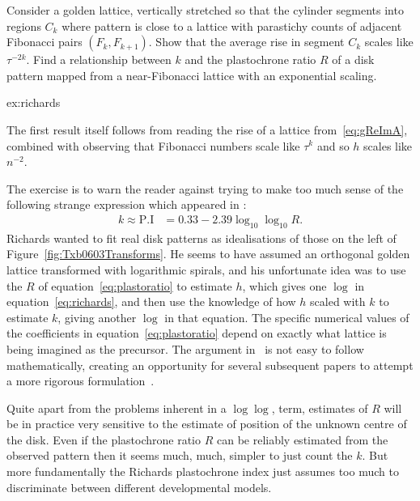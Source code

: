 \begin{jExercise}\label{ex:richards}
 Consider a golden lattice, vertically stretched so that the cylinder segments into regions $C_k$ where pattern is close to a lattice with parastichy counts of adjacent Fibonacci pairs $(F_k,F_{k+1})$.
	Show that the average rise in segment $C_k$ scales like $\tau^{-2k}$.
	Find a relationship between $k$ and the plastochrone ratio $R$ of a disk pattern mapped from a near-Fibonacci lattice with an exponential scaling.
\end{jExercise}
\begin{jAnswer}{ex:richards}{
	The first result itself follows
	from reading the rise of a lattice from~\eqref{eq:gReImA}, combined with observing that Fibonacci numbers scale like $\tau^k$
	and so $h$ scales like $n^{-2}$. 
	
The exercise is to warn the reader against trying to make too much sense of the following strange expression which appeared in
	\autocite{richardsPhyllotaxisItsQuantitative1951}:
	\begin{align}
		k\approx \mbox{P.I} &= 0.33 - 2.39 \log_{10}  \log_{10} R.
		\label{eq:richards}
	\end{align}
	 Richards wanted to fit real disk patterns as idealisations of those on the left of Figure~\ref{fig:Txb0603Transforms}. He  
	 seems to have assumed an orthogonal golden lattice transformed with logarithmic spirals, and his unfortunate idea was to use the $R$ of equation~\eqref{eq:plastoratio} to estimate $h$, which gives one $\log$ in equation~\ref{eq:richards}, and then use the knowledge of how $h$ scaled with $k$ to estimate $k$, giving another $\log$ in that equation. The specific numerical values of the coefficients in equation~\eqref{eq:plastoratio} depend on exactly what lattice is being imagined as the precursor. The argument in~	\autocite{richardsPhyllotaxisItsQuantitative1951} is not easy to follow mathematically, creating an opportunity for several subsequent papers to attempt a more rigorous formulation~\autocite{thornleyPhyllotaxisIIDescription1975,jeanBib647,jeanBib278}.

Quite apart from the problems inherent in a $\log \log$, term, estimates of $R$ will be in practice very sensitive  to the estimate of position of the unknown centre of the disk. Even if the plastochrone ratio $R$ can be reliably estimated from the observed pattern then it seems much, much,  simpler to just count the $k$. But more fundamentally the Richards plastochrone index just assumes too much to discriminate between different developmental models.  
}
\end{jAnswer}


